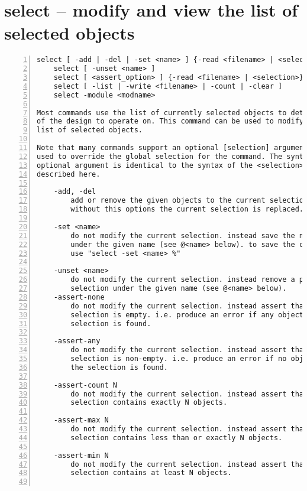 \section{select -- modify and view the list of selected objects}
\label{cmd:select}
\begin{lstlisting}[numbers=left,frame=single]
    select [ -add | -del | -set <name> ] {-read <filename> | <selection>}
    select [ -unset <name> ]
    select [ <assert_option> ] {-read <filename> | <selection>}
    select [ -list | -write <filename> | -count | -clear ]
    select -module <modname>

Most commands use the list of currently selected objects to determine which part
of the design to operate on. This command can be used to modify and view this
list of selected objects.

Note that many commands support an optional [selection] argument that can be
used to override the global selection for the command. The syntax of this
optional argument is identical to the syntax of the <selection> argument
described here.

    -add, -del
        add or remove the given objects to the current selection.
        without this options the current selection is replaced.

    -set <name>
        do not modify the current selection. instead save the new selection
        under the given name (see @<name> below). to save the current selection,
        use "select -set <name> %"

    -unset <name>
        do not modify the current selection. instead remove a previously saved
        selection under the given name (see @<name> below).
    -assert-none
        do not modify the current selection. instead assert that the given
        selection is empty. i.e. produce an error if any object matching the
        selection is found.

    -assert-any
        do not modify the current selection. instead assert that the given
        selection is non-empty. i.e. produce an error if no object matching
        the selection is found.

    -assert-count N
        do not modify the current selection. instead assert that the given
        selection contains exactly N objects.

    -assert-max N
        do not modify the current selection. instead assert that the given
        selection contains less than or exactly N objects.

    -assert-min N
        do not modify the current selection. instead assert that the given
        selection contains at least N objects.


\end{lstlisting}

